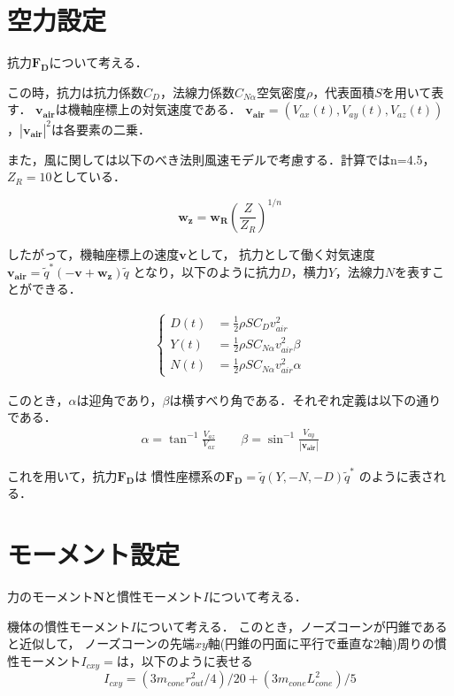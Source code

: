 \documentclass[a4paper]{jsarticle}
\begin{document}
\section{空力設定}
抗力$\bm{F_D}$について考える．

この時，抗力は抗力係数$C_D$，法線力係数$C_{N\alpha}$空気密度$\rho$，代表面積$S$を用いて表す．
$\bm{v_{air}}$は機軸座標上の対気速度である．
$\bm{v_{air}} = (V_{ax}(t), V_{ay}(t), V_{az}(t))$，$|\bm{v_{air}}|^2$は各要素の二乗．

また，風に関しては以下のべき法則風速モデルで考慮する．計算ではn=4.5，$Z_R=10$としている．

\begin{equation}
  \bm{w_z} = \bm{w_R} (\frac{Z}{Z_R})^{1/n}
\end{equation}

したがって，機軸座標上の速度$\bm{v}$として，
抗力として働く対気速度$\bm{v_{air}} = \tilde{q}^*(- \bm{v} + \bm{w_z})\tilde{q}$
となり，以下のように抗力$D$，横力$Y$，法線力$N$を表すことができる．

\begin{eqnarray}
  \begin{cases}
    D(t) &= \frac{1}{2} \rho S C_D v_{air}^2 \\
    Y(t) &= \frac{1}{2} \rho S C_{N\alpha} v_{air}^2 \beta \\
    N(t) &= \frac{1}{2} \rho S C_{N\alpha} v_{air}^2 \alpha
  \end{cases}
\end{eqnarray}

このとき，$\alpha$は迎角であり，$\beta$は横すべり角である．それぞれ定義は以下の通りである．
\begin{eqnarray}
  \alpha = \tan^{-1} \frac{V_{az}}{V_{ax}} \qquad
  \beta = \sin^{-1} \frac{V_{ay}}{|\bm{v_{air}}|}
\end{eqnarray}

これを用いて，抗力$\bm{F_D}$は
慣性座標系の$\bm{F_D} = \tilde{q}(Y, -N, -D)\tilde{q}^*$
のように表される．

\section{モーメント設定}
力のモーメント$\bm{N}$と慣性モーメント$I$について考える．

機体の慣性モーメント$I$について考える．
このとき，ノーズコーンが円錐であると近似して，
ノーズコーンの先端$xy$軸(円錐の円面に平行で垂直な2軸)周りの慣性モーメント$I_{cxy} = $は，以下のように表せる
\begin{equation}
  I_{cxy} = (3 m_{cone}r_{out}^2 / 4) / 20 + (3m_{cone}L_{cone}^2) / 5
\end{equation}
\end{document}

